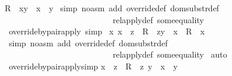 \begin{isabellebody}
{\isachardoublequoteopen}{\isacharparenleft}R\ {\isacharparenleft}{\isacharplus}{\isacharparenright}\ {\isacharbraceleft}{\isacharparenleft}x{\isacharcomma}y{\isacharparenright}{\isacharbraceright}{\isacharparenright}\ {\isacharpercent}{\isacharcircum}\ x\ {\isacharequal}\ y{\isachardoublequoteclose}\isanewline
%
\isadelimproof
%
\endisadelimproof
%
\isatagproof
{}\isamarkupfalse%
\ {\isacharparenleft}simp\ {\isacharparenleft}no{\isacharunderscore}asm{\isacharparenright}\ add{\isacharcolon}\ override{\isacharunderscore}def\ dom{\isacharunderscore}substr{\isacharunderscore}def\ \isanewline
\ \ \ \ \ \ \ \ \ \ \ \ \ \ \ \ \ \ \ \ \ \ \ \ \ \ rel{\isacharunderscore}apply{\isacharunderscore}def\ some{\isacharunderscore}equality{\isacharparenright}\isanewline
{}\isamarkupfalse%
%
\endisatagproof
{\isafoldproof}%
%
\isadelimproof
\isanewline
%
\endisadelimproof
\isanewline
{}\isamarkupfalse%
\ override{\isacharunderscore}by{\isacharunderscore}pair{\isacharunderscore}apply{}\ {\isacharbrackleft}simp{\isacharbrackright}{\isacharcolon}\ \isanewline
{\isachardoublequoteopen}{\isacharbang}{\isacharbang}x{\isachardot}\ x\ {\isachartilde}{\isacharequal}\ z\ {\isacharequal}{\isacharequal}{\isachargreater}\ {\isacharparenleft}R\ {\isacharparenleft}{\isacharplus}{\isacharparenright}\ {\isacharbraceleft}{\isacharparenleft}z{\isacharcomma}y{\isacharparenright}{\isacharbraceright}{\isacharparenright}\ {\isacharpercent}{\isacharcircum}\ x\ {\isacharequal}\ R\ {\isacharpercent}{\isacharcircum}\ x{\isachardoublequoteclose}\isanewline
%
\isadelimproof
%
\endisadelimproof
%
\isatagproof
{}\isamarkupfalse%
\ {\isacharparenleft}simp\ {\isacharparenleft}no{\isacharunderscore}asm{\isacharparenright}\ add{\isacharcolon}\ override{\isacharunderscore}def\ dom{\isacharunderscore}substr{\isacharunderscore}def\ \isanewline
\ \ \ \ \ \ \ \ \ \ \ \ \ \ \ \ \ \ \ \ \ \ \ \ \ \ rel{\isacharunderscore}apply{\isacharunderscore}def\ some{\isacharunderscore}equality{\isacharparenright}\isanewline
{}\isamarkupfalse%
\ auto\isanewline
{}\isamarkupfalse%
%
\endisatagproof
{\isafoldproof}%
%
\isadelimproof
\isanewline
%
\endisadelimproof
\isanewline
{}\isamarkupfalse%
\ override{\isacharunderscore}by{\isacharunderscore}pair{\isacharunderscore}apply{}{\isacharbrackleft}simp{\isacharbrackright}{\isacharcolon}\isanewline
{\isachardoublequoteopen}x\ {\isacharequal}\ z\ {\isacharequal}{\isacharequal}{\isachargreater}\ {\isacharparenleft}R\ {\isacharparenleft}{\isacharplus}{\isacharparenright}\ {\isacharbraceleft}{\isacharparenleft}z{\isacharcomma}\ y{\isacharparenright}{\isacharbraceright}{\isacharparenright}\ {\isacharpercent}{\isacharcircum}\ x\ {\isacharequal}\ y{\isachardoublequoteclose}\isanewline

\end{isabellebody}

